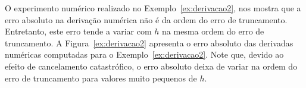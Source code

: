 \begin{obs}
  O experimento numérico realizado no Exemplo~\ref{ex:derivacao2}, nos mostra que a erro absoluto na derivação numérica não é da ordem do erro de truncamento. Entretanto, este erro tende a variar com $h$ na mesma ordem do erro de truncamento. A Figura~\ref{ex:derivacao2} apresenta o erro absoluto das derivadas numéricas computadas para o Exemplo~\ref{ex:derivacao2}. Note que, devido ao efeito de cancelamento catastrófico, o erro absoluto deixa de variar na ordem do erro de truncamento para valores muito pequenos de $h$.
\end{obs}


